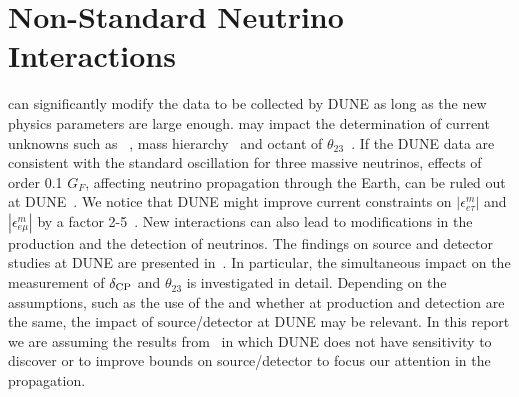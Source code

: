 \section{Non-Standard Neutrino Interactions}
\label{sec:nsi}
 can significantly modify the data to be collected by DUNE as long as the new physics parameters are large enough.  may impact the determination of current unknowns such as ~\cite{Masud:2015xva,Masud:2016bvp}, mass hierarchy~\cite{Masud:2016gcl} and octant of $\theta_{23}$~\cite{Agarwalla:2016fkh}. If the DUNE data are consistent with the standard oscillation for three massive neutrinos,   effects of order 0.1 $G_F$, affecting neutrino propagation through the Earth, can be ruled out at DUNE~\cite{deGouvea:2015ndi,Coloma:2015kiu}. We notice that DUNE might improve current constraints on $|\epsilon^m_{e \tau}|$ and $|\epsilon^m_{e \mu}|$ by a factor 2-5~\cite{Ohlsson:2012kf,Miranda:2015dra,Farzan:2017xzy}. New    interactions can also lead to modifications in the production and the detection of neutrinos. The findings on source and detector  studies at DUNE are presented in~\cite{Blennow:2016etl,Bakhti:2016gic}. In particular, the simultaneous impact on the measurement of $\delta_{\rm CP}$ and $\theta_{23}$ is investigated in detail. Depending on the assumptions, such as the use of the   and whether  at production and detection are the same, the impact of source/detector  at DUNE may be relevant. In this report we are assuming the results from~\cite{Blennow:2016etl} in which DUNE does not have sensitivity to discover or to improve bounds on source/detector  to focus our attention in the propagation.

